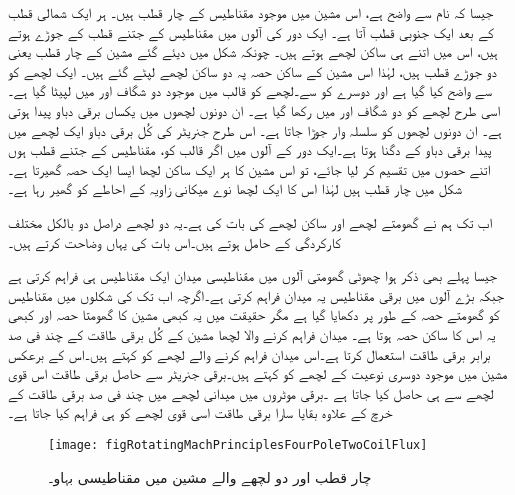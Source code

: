  جیسا کہ نام سے واضح ہے، اس مشین میں موجود  مقناطیس کے چار قطب  ہیں۔ ہر ایک شمالی قطب کے بعد ایک جنوبی قطب آتا ہے۔ ایک دور کی آلوں میں مقناطیس کے جتنے  قطب کے جوڑے ہوتے ہیں، اس میں  اتنے ہی ساکن لچھے ہوتے ہیں۔ چونکہ شکل  میں دیئے گئے مشین کے چار قطب یعنی دو جوڑے قطب ہیں،  لہٰذا اس مشین کے ساکن حصہ پہ دو ساکن لچھے لپٹے  گئے ہیں۔ ایک لچھے کو  سے واضح کیا گیا ہے اور دوسرے کو  سے۔لچھے  کو  قالب میں موجود دو شگاف  اور  میں لپیٹا گیا ہے۔ اسی طرح  لچھے کو دو شگاف  اور  میں رکھا گیا ہے۔ ان دونوں لچھوں میں یکساں برقی دباو پیدا ہوتی ہے۔ ان دونوں لچھوں کو سلسلہ وار جوڑا جاتا ہے۔ اس طرح جنریٹر کی کُل برقی دباو ایک لچھے میں پیدا  برقی دباو کے دگنا ہوتا ہے۔ایک دور کے آلوں میں  اگر قالب کو، مقناطیس کے جتنے قطب ہوں اتنے حصوں میں تقسیم کر لیا جائے، تو اس مشین کا ہر ایک ساکن لچھا ایسا ایک حصہ گھیرتا ہے۔ شکل میں چار  قطب  ہیں  لہٰذا اس کا ایک لچھا  نوے میکانی زاویہ کے احاطے کو گھیر رہا ہے۔

اب تک ہم نے گھومتے لچھے اور ساکن لچھے کی بات کی ہے۔یہ دو لچھے دراصل دو بالکل مختلف کارکردگی کے حامل ہوتے ہیں۔اس بات کی  یہاں وضاحت کرتے ہیں۔

جیسا پہلے بھی ذکر ہوا چھوٹی گھومتی آلوں میں مقناطیسی میدان ایک مقناطیس ہی فراہم کرتی ہے جبکہ بڑے آلوں میں برقی مقناطیس یہ میدان فراہم کرتی ہے۔اگرچہ اب تک کی شکلوں میں مقناطیس کو گھومتے حصہ کے طور پر دکھایا گیا ہے مگر حقیقت میں یہ کبھی مشین کا گھومتا حصہ اور کبھی یہ اس کا ساکن حصہ ہوتا ہے۔ میدان فراہم کرنے والا لچھا مشین کے کُل برقی طاقت کے چند فی صد برابر برقی طاقت استعمال کرتا ہے۔اس  میدان فراہم کرنے والے لچھے کو   کہتے ہیں۔اس کے برعکس مشین میں موجود دوسری نوعیت کے لچھے کو   کہتے ہیں۔برقی جنریٹر سے حاصل برقی طاقت اس قوی لچھے سے ہی حاصل کیا جاتا ہے ۔برقی موٹروں میں میدانی لچھے میں چند فی صد برقی طاقت کے خرچ کے علاوہ بقایا سارا برقی طاقت اسی قوی لچھے کو ہی فراہم کیا جاتا ہے۔
\begin{figure}
\centering
\texttt{[image: figRotatingMachPrinciplesFourPoleTwoCoilFlux]}
\caption{چار قطب اور دو لچھے والے مشین میں مقناطیسی بہاو۔}
\label{شکل_گھومتے_مشین_چار_قطب_کا_بہاو}
\end{figure}


